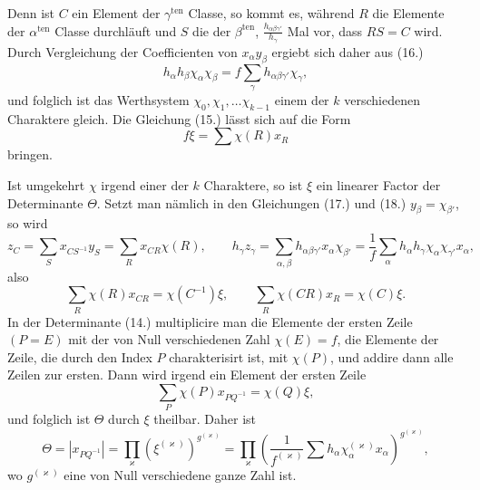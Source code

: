 \documentclass[11pt]{article}
\begin{document}
Denn ist $C$ ein Element der $\gamma^{\text{ten}}$ Classe, so kommt es, während $R$ die Elemente der $\alpha^{\text{ten}}$ Classe durchläuft und $S$ die der $\beta^{\text{ten}}$, $\frac{h_{\alpha\beta\gamma'}}{h_\gamma}$ Mal vor, dass $RS=C$ wird. Durch Vergleichung der Coefficienten von $x_\alpha y_\beta$ ergiebt sich daher aus (16.)
\begin{equation*}\tag{19.}
h_\alpha h_\beta\chi_\alpha\chi_\beta=f\sum_\gamma h_{\alpha\beta\gamma'}\chi_\gamma,
\end{equation*}
und folglich ist das Werthsystem $\chi_0,\chi_1,\ldots\chi_{k-1}$ einem der $k$ verschiedenen Charaktere gleich. Die Gleichung (15.) lässt sich auf die Form
\begin{equation*}\tag{20.}
f\xi=\sum\chi(R)x_R
\end{equation*}
bringen.


Ist umgekehrt $\chi$ irgend einer der $k$ Charaktere, so ist $\xi$ ein linearer Factor der Determinante $\Theta$. Setzt man nämlich in den Gleichungen (17.) und (18.) $y_\beta=\chi_{\beta'}$, so wird
\[
z_C=\sum_S x_{CS^{-1}}y_S=\sum_R x_{CR}\chi(R),\qquad h_\gamma z_\gamma=\sum_{\alpha,\beta}h_{\alpha\beta\gamma'}x_\alpha\chi_{\beta'}=\frac{1}{f}\sum_\alpha h_\alpha h_\gamma\chi_\alpha\chi_{\gamma'}x_\alpha,
\]
also
\begin{equation*}\tag{21.}
\sum_R \chi(R)x_{CR}=\chi(C^{-1})\xi,
\qquad
\sum_R \chi(CR)x_R=\chi(C)\xi.
\end{equation*}
In der Determinante (14.) multiplicire man die Elemente der ersten Zeile $(P=E)$ mit der von Null verschiedenen Zahl $\chi(E)=f$, die Elemente der Zeile, die durch den Index $P$ charakterisirt ist, mit $\chi(P)$, und addire dann alle Zeilen zur ersten. Dann wird irgend ein Element der ersten Zeile
\[
\sum_P\chi(P)x_{PQ^{-1}}=\chi(Q)\xi,
\]
und folglich ist $\Theta$ durch $\xi$ theilbar. Daher ist
\begin{equation*}\tag{22.}
\Theta=\left|x_{PQ^{-1}}\right|=\prod_\varkappa\left(\xi^{(\varkappa)}\right)^{g^{(\varkappa)}}
=\prod_\varkappa\left(\frac{1}{f^{(\varkappa)}}\sum h_\alpha\chi_\alpha^{(\varkappa)}x_\alpha\right)^{g^{(\varkappa)}},
\end{equation*}
wo $g^{(\varkappa)}$ eine von Null verschiedene ganze Zahl ist.
\end{document}
